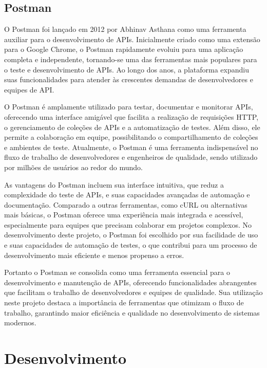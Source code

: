 \subsection{Postman}

O Postman foi lançado em 2012 por Abhinav Asthana como uma ferramenta auxiliar para o desenvolvimento de APIs. Inicialmente criado como uma extensão para o Google Chrome, o Postman rapidamente evoluiu para uma aplicação completa e independente, tornando-se uma das ferramentas mais populares para o teste e desenvolvimento de APIs. Ao longo dos anos, a plataforma expandiu suas funcionalidades para atender às crescentes demandas de desenvolvedores e equipes de API.

O Postman é amplamente utilizado para testar, documentar e monitorar APIs, oferecendo uma interface amigável que facilita a realização de requisições HTTP, o gerenciamento de coleções de APIs e a automatização de testes. Além disso, ele permite a colaboração em equipe, possibilitando o compartilhamento de coleções e ambientes de teste. Atualmente, o Postman é uma ferramenta indispensável no fluxo de trabalho de desenvolvedores e engenheiros de qualidade, sendo utilizado por milhões de usuários ao redor do mundo.

As vantagens do Postman incluem sua interface intuitiva, que reduz a complexidade do teste de APIs, e suas capacidades avançadas de automação e documentação. Comparado a outras ferramentas, como cURL ou alternativas mais básicas, o Postman oferece uma experiência mais integrada e acessível, especialmente para equipes que precisam colaborar em projetos complexos. No desenvolvimento deste projeto, o Postman foi escolhido por sua facilidade de uso e suas capacidades de automação de testes, o que contribui para um processo de desenvolvimento mais eficiente e menos propenso a erros.

Portanto o Postman se consolida como uma ferramenta essencial para o desenvolvimento e manutenção de APIs, oferecendo funcionalidades abrangentes que facilitam o trabalho de desenvolvedores e equipes de qualidade. Sua utilização neste projeto destaca a importância de ferramentas que otimizam o fluxo de trabalho, garantindo maior eficiência e qualidade no desenvolvimento de sistemas modernos.


\section{Desenvolvimento}\label{sec:desenvolvimento}

